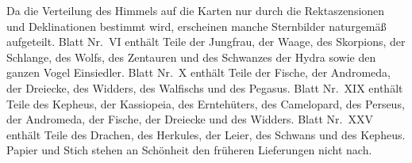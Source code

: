 Da die Verteilung des Himmels auf die Karten nur durch die Rektaszensionen und Deklinationen bestimmt wird, erscheinen manche Sternbilder \mbox{naturgemäß} aufgeteilt. Blatt Nr.\ VI enthält Teile der Jungfrau, der Waage, des Skorpions, der Schlange, des Wolfs, des Zentauren und des Schwanzes der Hydra sowie den ganzen Vogel Einsiedler. Blatt Nr.\ X enthält Teile der Fische, der Andromeda, der Dreiecke, des Widders, des Walfischs und des Pegasus. Blatt Nr.\ XIX enthält Teile des Kepheus, der Kassiopeia, des Erntehüters, des Camelopard, des Perseus, der Andromeda, der Fische, der Dreiecke und des Widders. Blatt Nr.\ XXV enthält Teile des Drachen, des Herkules, der Leier, des Schwans und des Kepheus. Papier und Stich stehen an Schönheit den früheren Lieferungen nicht nach.
